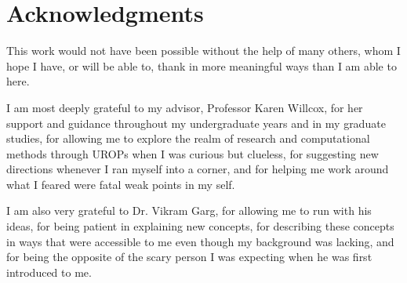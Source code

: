 
\cleardoublepage
\setcounter{savepage}{\thepage}

\begin{abstractpage}

\end{abstractpage}

% 

\cleardoublepage

\section*{Acknowledgments}

This work would not have been possible without the help of many others, whom I hope I have, or will be able to, thank in more meaningful ways than I am able to here. 

I am most deeply grateful to my advisor, Professor Karen Willcox, for her support and guidance throughout my undergraduate years and in my graduate studies, for allowing me to explore the realm of research and computational methods through UROPs when I was curious but clueless, for suggesting new directions whenever I ran myself into a corner, and for helping me work around what I feared were fatal weak points in my self.

I am also very grateful to Dr. Vikram Garg, for allowing me to run with his ideas, for being patient in explaining new concepts, for describing these concepts in ways that were accessible to me even though my background was lacking, and for being the opposite of the scary person I was expecting when he was first introduced to me. 

